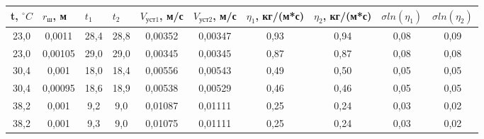 \documentclass[12pt,a4paper]{article}
\begin{document}
\begin{enumerate}
\begin{table}[h!]
\begin{tabular}{|c|c|c|c|c|c|c|c|c|c|}
\hline
\multicolumn{1}{|l|}{t, $^\circ C$} & \multicolumn{1}{l|}{$r_ш$, м} & \multicolumn{1}{l|}{$t_1$} & \multicolumn{1}{l|}{$t_2$} & \multicolumn{1}{l|}{$V_{уст1}$, м/с} & \multicolumn{1}{l|}{$V_{уст2}$, м/с} & \multicolumn{1}{l|}{$\eta_1$, кг/(м*с)} & \multicolumn{1}{l|}{$\eta_2$, кг/(м*с)} & \multicolumn{1}{l|}{$\sigma ln(\eta _1)$} & \multicolumn{1}{l|}{$\sigma ln(\eta _2)$} \\ \hline
23,0                         & 0,0011                      & 28,4                    & 28,8                    & 0,00352                          & 0,00347                          & 0,93                              & 0,94                              & 0,08                     & 0,09                                             \\ \hline
23,0                         & 0,00105                     & 29,0                      & 29,0                      & 0,00345                          & 0,00345                          & 0,87                              & 0,87                              & 0,08                     & 0,08                                             \\ \hline
30,4                       & 0,001                       & 18,0                      & 18,4                    & 0,00556                          & 0,00543                          & 0,49                              & 0,50                              & 0,05                     & 0,05                                             \\ \hline
30,4                       & 0,00095                     & 18,6                    & 18,9                    & 0,00538                          & 0,00529                          & 0,46                              & 0,46                              & 0,05                     & 0,05                                             \\ \hline
38,2                       & 0,001                       & 9,2                     & 9,0                       & 0,01087                          & 0,01111                          & 0,25                              & 0,24                              & 0,03                     & 0,02                                             \\ \hline
38,2                       & 0,001                       & 9,3                     & 9,0                       & 0,01075                          & 0,01111                          & 0,25                              & 0,24                              & 0,03                     & 0,02                                             \\ \hline

\end{tabular}
\end{table}
\end{enumerate}
\end{document}

